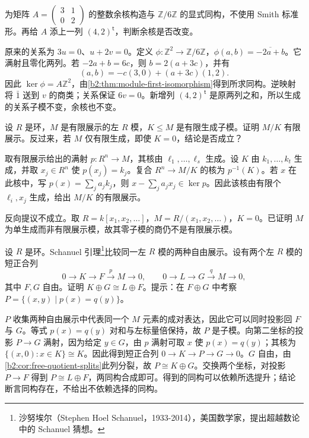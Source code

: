 \begin{exercise}\label{b2:ex:03-matrix-cokernel}
	为矩阵 \(A=\begin{pmatrix}3&1\\0&2\end{pmatrix}\) 的整数余核构造与 \(\mathbb Z/6\mathbb Z\) 的显式同构，不使用 Smith 标准形。再给 \(A\) 添上一列 \((4,2)^{\mathsf t}\)，判断余核是否改变。
\end{exercise}
\begin{solution}
	原来的关系为 \(3u=0\)、\(u+2v=0\)。定义 \(\phi:\mathbb Z^2\to\mathbb Z/6\mathbb Z\)，\(\phi(a,b)=\overline{-2a+b}\)。它满射且零化两列。若 \(-2a+b=6c\)，则 \(b=2(a+3c)\)，并有
	\[
		(a,b)=-c(3,0)+(a+3c)(1,2).
	\]
	因此 \(\ker\phi=A\mathbb Z^2\)，由\cref{b2:thm:module-first-isomorphism}得到所求同构。逆映射将 \(\bar1\) 送到 \(v\) 的商类；关系保证 \(6v=0\)。新增列 \((4,2)^{\mathsf t}\) 是原两列之和，所以生成的关系子模不变，余核也不变。
\end{solution}

\begin{exercise}\label{b2:ex:03-finite-presentation-quotient}
	设 \(R\) 是环，\(M\) 是有限展示的左 \(R\) 模，\(K\le M\) 是有限生成子模。证明 \(M/K\) 有限展示。反过来，若 \(M\) 仅有限生成，即使 \(K=0\)，结论是否成立？
\end{exercise}
\begin{solution}
	取有限展示给出的满射 \(p:R^n\to M\)，其核由 \(\ell_1,\ldots,\ell_s\) 生成。设 \(K\) 由 \(k_1,\ldots,k_t\) 生成，并取 \(x_j\in R^n\) 使 \(p(x_j)=k_j\)。复合 \(R^n\to M/K\) 的核为 \(p^{-1}(K)\)。若 \(x\) 在此核中，写 \(p(x)=\sum_j a_jk_j\)，则 \(x-\sum_j a_jx_j\in\ker p\)。因此该核由有限个 \(\ell_i,x_j\) 生成，给出 \(M/K\) 的有限展示。

	反向提议不成立。取 \(R=k[x_1,x_2,\ldots]\)，\(M=R/(x_1,x_2,\ldots)\)，\(K=0\)。已证明 \(M\) 为单生成而非有限展示模，故其零子模的商仍不是有限展示模。
\end{solution}

\begin{optionalexercise}[Schanuel 引理]\label{b2:ex:03-schanuel}
	设 \(R\) 是环。Schanuel 引理\footnote{沙努埃尔（Stephen Hoel Schanuel，1933-2014），美国数学家，提出超越数论中的 Schanuel 猜想。}比较同一左 \(R\) 模的两种自由展示。设有两个左 \(R\) 模的短正合列
	\[
		0\longrightarrow K\longrightarrow F\xrightarrow{p}M\longrightarrow0, \qquad 0\longrightarrow L\longrightarrow G\xrightarrow{q}M\longrightarrow0,
	\]
	其中 \(F,G\) 自由。证明 \(K\oplus G\cong L\oplus F\)。提示：在 \(F\oplus G\) 中考察 \(P=\{(x,y)\mid p(x)=q(y)\}\)。
\end{optionalexercise}
\begin{solution}
	\(P\) 收集两种自由展示中代表同一个 \(M\) 元素的成对表达，因此它可以同时投影回 \(F\) 与 \(G\)。等式 \(p(x)=q(y)\) 对和与左标量倍保持，故 \(P\) 是子模。向第二坐标的投影 \(P\to G\) 满射，因为给定 \(y\in G\)，由 \(p\) 满射可取 \(x\) 使 \(p(x)=q(y)\)；其核为 \(\{(x,0):x\in K\}\cong K\)。因此得到短正合列 \(0\to K\to P\to G\to0\)。\(G\) 自由，由\cref{b2:cor:free-quotient-splits}此列分裂，故 \(P\cong K\oplus G\)。交换两个坐标，对投影 \(P\to F\) 得到 \(P\cong L\oplus F\)，两同构合成即可。得到的同构可以依赖所选提升；结论断言同构存在，不给出不依赖选择的同构。
\end{solution}

